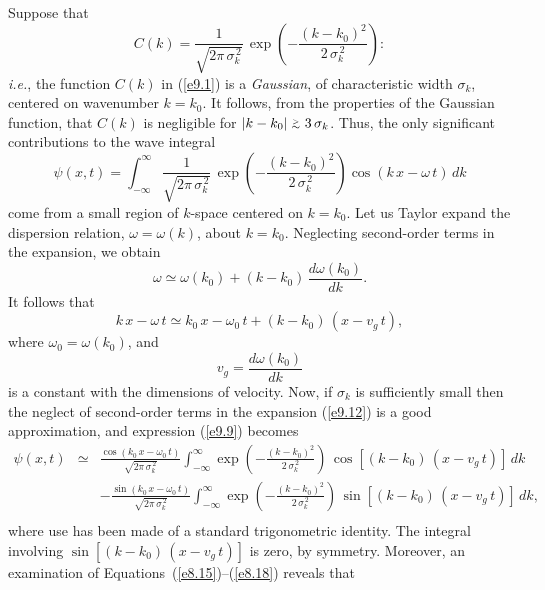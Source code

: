 Suppose that
\begin{equation}
C(k) = \frac{1}{\sqrt{2\pi\,\sigma_k^{\,2}}}\,\exp\left(-\frac{(k-k_0)^2}{2\,\sigma_k^{\,2}}\right):
\end{equation}
{\em i.e.}, the  function $C(k)$ in (\ref{e9.1}) is a {\em Gaussian}, of characteristic width $\sigma_k$, centered on wavenumber $k=k_0$. It follows, from the properties of the
Gaussian function, that $C(k)$ is negligible for $|k-k_0|\stackrel {_{\normalsize>}}{_{\normalsize \sim}} 3\,\sigma_k$. 
Thus, the only significant contributions to the wave 
integral
\begin{equation}\label{e9.9}
\psi(x,t) = \int_{-\infty}^\infty\frac{1}{\sqrt{2\pi\,\sigma_k^{\,2}}}\,\exp\left(-\frac{(k-k_0)^2}{2\,\sigma_k^{\,2}}\right)\cos(k\,x-\omega\,t)\,dk
\end{equation}
come from a small region of $k$-space centered on $k=k_0$. Let us
Taylor expand the dispersion relation, $\omega=\omega(k)$, about $k=k_0$.
Neglecting second-order terms in the expansion, we obtain
\begin{equation}\label{e9.11}
\omega \simeq \omega(k_0) + (k-k_0)\,\frac{d\omega(k_0)}{dk}.
\end{equation}
It follows that
\begin{equation}\label{e9.12}
k\,x-\omega\,t \simeq  k_0\,x-\omega_0\,t + (k-k_0)\,(x-v_g\,t),
\end{equation}
where $\omega_0=\omega(k_0)$, and
\begin{equation}\label{e9.12a}
v_g = \frac{d\omega(k_0)}{dk}
\end{equation}
is a constant with the dimensions of velocity. 
Now, if $\sigma_k$ is sufficiently small then the neglect of second-order terms in the expansion (\ref{e9.12}) is a good approximation,  and  expression (\ref{e9.9}) becomes
\begin{eqnarray}
\psi(x,t) &\simeq&  \frac{\cos(k_0\,x-\omega_0\,t)}{\sqrt{2\pi\,\sigma_k^{\,2}}}\int_{-\infty}^\infty
\exp\left(-\frac{(k-k_0)^2}{2\,\sigma_k^{\,2}}\right)\,\cos[(k-k_0)\,(x-v_g\,t)]\,dk\nonumber\\[0.5ex]
&&-  \frac{\sin(k_0\,x-\omega_0\,t)}{\sqrt{2\pi\,\sigma_k^{\,2}}}\int_{-\infty}^\infty
\exp\left(-\frac{(k-k_0)^2}{2\,\sigma_k^{\,2}}\right)\,\sin[(k-k_0)\,(x-v_g\,t)]\,dk,\nonumber\\[0.5ex]&&\label{e9.13}
\end{eqnarray}
where use has been made of a standard trigonometric identity. 
The integral involving $\sin[(k-k_0)\,(x-v_g\,t)]$ is zero, by symmetry. Moreover,
an examination of Equations~(\ref{e8.15})--(\ref{e8.18}) reveals that
